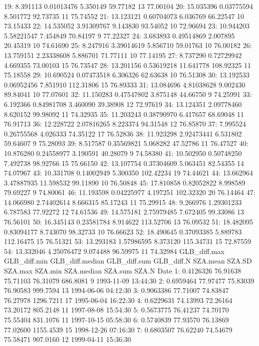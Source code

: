 \documentclass[
  10pt,
  a4paper,oneside]{article}
\begin{document}
19: 8.391113 0.01013476 5.350149 59.77182 13 77.00104
20: 15.035396 0.03775594 8.501772 92.73735 11 75.74552
21: 13.123121 0.60704073 6.036769 66.22547 10 73.15433
22: 14.535052 3.91309767 9.143830 93.54052 10 72.96694
23: 10.944203 5.58221547 7.454849 70.84197 9 77.22327
24: 3.683893 0.49514869 2.007895 20.45319 10 74.61690
25: 8.247916 3.39014619 5.856710 59.01763 10 76.00182
26: 13.759151 2.23338608 5.886701 71.77111 10 77.14195
27: 8.737290 0.72729942 4.669355 73.00103 15 76.73547
28: 13.201156 0.53619218 11.641778 108.92325 11 75.18558
29: 10.690524 0.07473518 6.306326 62.63638 10 76.51308
30: 13.192533 0.06952456 7.851910 112.31806 15 76.89333
31: 13.084696 4.81038628 9.002430 89.84041 10 77.07601
32: 11.150283 0.47547802 3.875148 44.66750 9 74.25991
33: 6.192366 0.84981708 3.460090 39.38908 12 72.97619
34: 13.124351 2.09778460 8.620152 99.98092 11 74.32935
35: 11.203243 0.38790970 6.417657 68.69048 11 76.91713
36: 12.228722 2.07816265 8.223374 94.31548 12 76.85870
37: 7.995524 0.26755568 4.026333 74.35122 17 76.52836
38: 11.923298 2.92473441 6.531802 59.64607 9 75.28093
39: 8.517587 0.35569821 5.068282 47.52786 11 76.47527
40: 10.876280 0.24558977 3.190591 40.28079 9 74.58380
41: 10.502950 0.50748250 7.492738 98.92766 15 75.66150
42: 13.107754 0.37304609 5.063451 82.54355 14 74.07967
43: 10.331708 0.14002949 5.300350 102.42234 19 74.44621
44: 13.662964 3.47887935 11.598532 99.11890 10 76.50848
45: 17.810858 0.82052822 8.998589 79.69227 9 74.80061
46: 11.193598 0.04225977 4.197251 102.32320 20 76.14464
47: 14.066980 2.74402614 8.666315 85.17243 11 75.29915
48: 9.266976 1.29301233 6.787583 77.92272 12 74.61536
49: 14.575181 2.75979485 7.672405 99.33086 13 76.56101
50: 16.345143 0.23581784 8.914622 113.52706 13 76.09532
51: 18.482095 0.83094177 8.743070 98.32733 10 76.66623
52: 18.490645 0.37093385 5.889783 112.16475 15 76.51321
53: 13.293183 1.57986595 8.373120 115.34731 15 72.87559
54: 13.332046 4.25076472 9.074488 96.59975 11 74.32984
GLB\_diff.max GLB\_diff.min GLB\_diff.median GLB\_diff.sum GLB\_diff.N SZA.mean
SZA.SD SZA.max SZA.min SZA.median SZA.sum SZA.N Date
1: 0.4126326 76.91638 75.71103 76.31079 686.8081 9 1993-11-09 13:44:30
2: 0.6959464 77.97477 75.83039 76.90583 999.7594 13 1994-06-06 04:12:30
3: 0.9063386 77.71007 74.83847 76.27978 1296.7211 17 1995-06-04 16:22:30
4: 0.6229631 74.13993 72.26164 73.20172 805.2148 11 1997-08-08 15:54:30
5: 0.5673775 76.41237 74.70170 75.55404 831.1076 11 1997-10-15 05:58:30
6: 0.5740839 77.93570 76.13869 77.02600 1155.4539 15 1998-12-26 07:16:30
7: 0.6803507 76.62240 74.54679 75.58471 907.0160 12 1999-04-11 15:36:30
\end{document}

